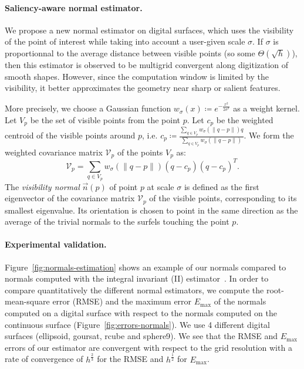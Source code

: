 \newcommand{\Kernel}[1]{\ensuremath{w_{\sigma}(#1)}}

\paragraph{Saliency-aware normal estimator.}
We propose a new normal estimator on digital surfaces, which uses
the visibility of the point of interest while taking into account
a user-given scale $\sigma$. If $\sigma$ is proportionnal to the
average distance between visible points (so some
$\Theta\left(\sqrt{h}\right)$), then this estimator is observed to be
multigrid convergent along digitization of smooth shapes. However,
since the computation window is limited by the visibility, it
better approximates the geometry near sharp or salient features.

More precisely, we choose a Gaussian function
$\Kernel{x}\coloneqq e^{-\frac{x^2}{2\sigma^2}}$ as a weight kernel. Let
$V_p$ be the set of visible points from the point $p$. Let $c_p$
be the weighted centroid of the visible points around $p$,
i.e. $c_p \coloneqq \frac{\sum_{q \in V_p} \Kernel{\|q-p\|}q}{\sum_{q \in
V_p} \Kernel{\|q-p\|}}$. We form the weighted covariance matrix
$\mathcal{V}_p$ of the points $V_p$ as:
\begin{equation}
    \mathcal{V}_p = \sum_{q \in V_p} \Kernel{\|q-p\|}(q - c_p)(q - c_p)^T.
\end{equation}
The \emph{visibility normal} $\vec{n}(p)$ of point $p$ at scale $\sigma$ is defined
as the first eigenvector of the covariance matrix $\mathcal{V}_p$
of the visible points, corresponding to its smallest
eigenvalue. Its orientation is chosen to point in the same
direction as the average of the trivial normals to the surfels
touching the point $p$.

\paragraph{Experimental validation.}
Figure~\ref{fig:normals-estimation} shows an example
of our normals compared to normals computed with the integral invariant (II) estimator~\cite{Lachaud:2017-lnm}.
In order to compare quantitatively the different normal estimators, we compute the
root-mean-square error (RMSE) and the maximum error $E_{\max}$ of the
normals computed on a digital surface with respect to the normals computed
on the continuous surface (Figure~\ref{fig:errors-normals}). We use 4 different digital surfaces (ellipsoid,
goursat, rcube and sphere9). We see that the RMSE and $E_{\max}$ errors of our
estimator are convergent with respect to the grid resolution with a
rate of convergence of $h^{\frac{2}{3}}$ for the RMSE and $h^{\frac{1}{2}}$ for
$E_{\max}$.

